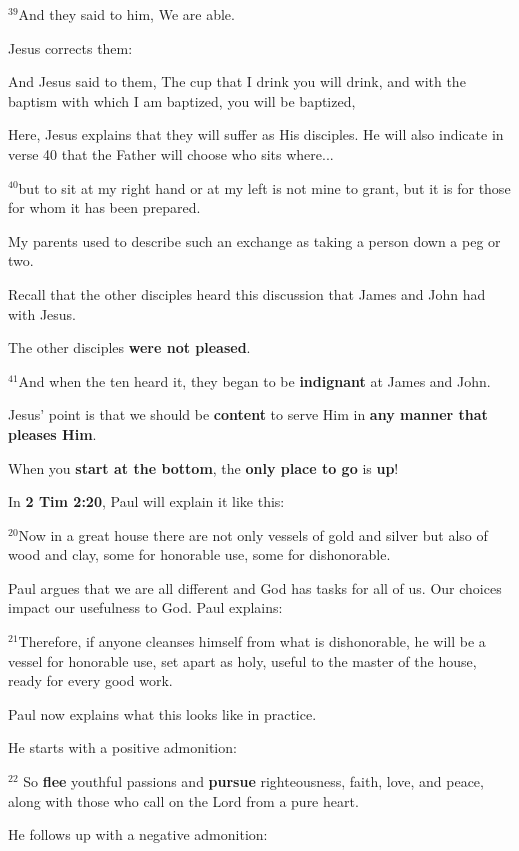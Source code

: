 \documentclass[12pt]{article} %
\newcommand{\superscript}[1]{\ensuremath{^{\textrm{#1}}}}
\begin{document}
\begin{itemize}
\superscript{39}And they said to him, We are able.

Jesus corrects them:

And Jesus said to them, The cup that I drink you will drink, and with the
baptism with which I am baptized, you will be baptized,

Here, Jesus explains that they will suffer as His disciples. He will also
indicate in verse 40 that the Father will choose who sits where...

\superscript{40}but to sit at my right hand or at my left is not mine to grant,
but it is for those for whom it has been prepared.

My parents used to describe such an exchange as taking a person down a peg or two.

Recall that the other disciples heard this discussion that James and John had with Jesus.

The other disciples \textbf{were not pleased}.

\superscript{41}And when the ten heard it, they began to be \textbf{indignant}
at James and John.

Jesus' point is that we should be \textbf{content} to serve Him in
\textbf{any manner that pleases Him}.

When you \textbf{start at the bottom}, the \textbf{only place to go} is
\textbf{up}!

In \textbf{2 Tim 2:20}, Paul will explain it like this:

\superscript{20}Now in a great house there are not only vessels of gold
and silver but also of wood and clay, some for honorable use, some for
dishonorable.
  
Paul argues that we are all different and God has tasks for all of us.
Our choices impact our usefulness to God. Paul explains:
  
\superscript{21}Therefore, if anyone cleanses himself from what is dishonorable,
he will be a vessel for honorable use, set apart as holy, useful to the
master of the house, ready for every good work.
  
Paul now explains what this looks like in practice.

He starts with a positive admonition:
  
\superscript{22} So \textbf{flee} youthful passions and \textbf{pursue}
righteousness, faith, love, and peace, along with those who call on the
Lord from a pure heart.
  
He follows up with a negative admonition:
  

\end{itemize}
\end{document}
